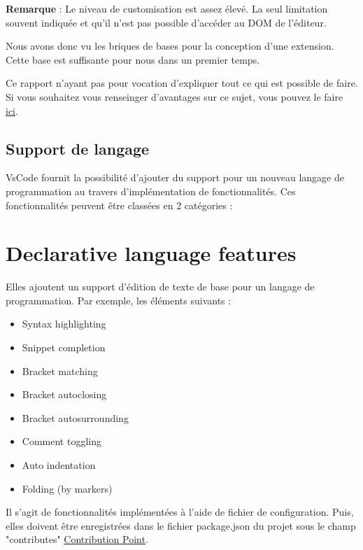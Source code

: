 \documentclass[
    iict, %
    il, %
]{heig-tb}
\begin{document}
\textbf{Remarque} : Le niveau de customisation est assez élevé. La seul limitation souvent indiquée et qu'il n'est pas possible d'accéder au DOM de l'éditeur.

Nous avons donc vu les briques de bases pour la conception d'une extension. Cette base est suffisante pour nous dans un premier temps.

Ce rapport n'ayant pas pour vocation d'expliquer tout ce qui est possible de faire. Si vous souhaitez vous renseinger d'avantages sur ce sujet, vous pouvez le faire \href{https://code.visualstudio.com/api}{ici}.

\subsection{Support de langage}
VsCode fournit la possibilité d'ajouter du support pour un nouveau langage de programmation au travers d'implémentation de fonctionnalités. Ces fonctionnalités peuvent être classées en 2 catégories :

\section{Declarative language features}
Elles ajoutent un support d'édition de texte de base pour un langage de programmation.
Par exemple, les éléments suivants :

\begin{itemize}
    \item Syntax highlighting
    \item Snippet completion
    \item Bracket matching
    \item Bracket autoclosing
    \item Bracket autosurrounding
    \item Comment toggling
    \item Auto indentation
    \item Folding (by markers)
\end{itemize}

Il s'agit de fonctionnalités implémentées à l'aide de fichier de configuration.
Puis, elles doivent être enregistrées dans le fichier package.json du projet sous le champ "contributes" \space \href{https://code.visualstudio.com/api/references/contribution-points}{ Contribution Point}.
\end{document}
